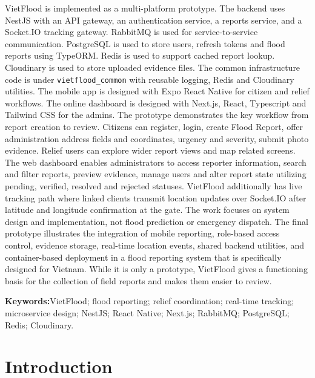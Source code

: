 \documentclass[12pt, twoside]{report}
\newcommand{\keywords}[1]{%
  \par\medskip
  \noindent\textbf{Keywords:}\enspace #1\par
}
\begin{document}
VietFlood is implemented as a multi-platform prototype. The backend uses NestJS with an API gateway, an authentication service, a reports service, and a Socket.IO tracking gateway. RabbitMQ is used for service-to-service communication. PostgreSQL is used to store users, refresh tokens and flood reports using TypeORM. Redis is used to support cached report lookup. Cloudinary is used to store uploaded evidence files. The common infrastructure code is under \texttt{vietflood\_common} with reusable logging, Redis and Cloudinary utilities. The mobile app is designed with Expo React Native for citizen and relief workflows. The online dashboard is designed with Next.js, React, Typescript and Tailwind CSS for the admins.
The prototype demonstrates the key workflow from report creation to review. Citizens can register, login, create Flood Report, offer administration address fields and coordinates, urgency and severity, submit photo evidence. Relief users can explore wider report views and map related screens. The web dashboard enables administrators to access reporter information, search and filter reports, preview evidence, manage users and alter report state utilizing pending, verified, resolved and rejected statuses. VietFlood additionally has live tracking path where linked clients transmit location updates over Socket.IO after latitude and longitude confirmation at the gate.
The work focuses on system design and implementation, not flood prediction or emergency dispatch. The final prototype illustrates the integration of mobile reporting, role-based access control, evidence storage, real-time location events, shared backend utilities, and container-based deployment in a flood reporting system that is specifically designed for Vietnam. While it is only a prototype, VietFlood gives a functioning basis for the collection of field reports and makes them easier to review.
\keywords{VietFlood; flood reporting; relief coordination; real-time tracking; microservice design; NestJS; React Native; Next.js; RabbitMQ; PostgreSQL; Redis; Cloudinary.}






\chapter{Introduction}
\setcounter{page}{1}

\end{document}
